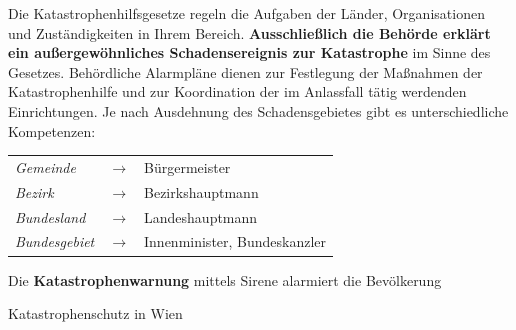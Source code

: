 \documentclass{article}
\newcommand\gEs[1]{\textbf{\textcolor[rgb]{0.0,0.0,0.5019608}{#1}}}
\newcommand\gEs[1]{\textbf{\textcolor[rgb]{0.0,0.0,0.5019608}{#1}}}
\newcommand\gE[1]{\textit{#1}}
\newcommand\gNw[1]{#1}
\begin{document}
{\mdseries
Die Katastrophenhilfsgesetze \gNw{r}egeln die Aufgaben der
L\"ander, Organisationen und Zust\"andigkeiten in Ihrem Bereich.
\gEs{Ausschlie{\ss}lich die Beh\"orde erkl\"art ein
au{\ss}ergew\"ohnliches Schadensereignis zur Katastrophe} im Sinne des
Gesetzes. Beh\"ordliche Alarmpl\"ane dienen zur Festlegung der
Ma{\ss}nahmen der Katastrophenhilfe und zur Koordination der im
Anlassfall t\"atig werdenden Einrichtungen. Je nach Ausdehnung des
Schadensgebietes gibt es unterschiedliche Kompetenzen:}

\begin{center}
\begin{tabular}{|m{2.375cm}m{0.45600003cm}m{6.1590004cm}|}
\hline
{\mdseries \gE{Gemeinde }}

 &
\centering ${\rightarrow}$\par

 &
{\mdseries B\"urgermeister}

\\
{\mdseries \gE{Bezirk }}

 &
\centering ${\rightarrow}$\par

 &
{\mdseries Bezirkshauptmann}

\\
{\mdseries \gE{Bundesland }}

 &
\centering ${\rightarrow}$\par

 &
{\mdseries Landeshauptmann}

\\
{\mdseries \gE{Bundesgebiet}}

 &
\centering ${\rightarrow}$\par

 &
{\mdseries Innenminister, Bundeskanzler}

\\\hline
\end{tabular}
\end{center}
{\mdseries\color{black}
Die \gEs{Katastrophenwarnung} mittels Sirene
alarmiert die Bev\"olkerung}

{\mdseries\color[rgb]{0.0,0.0,0.5019608}
Katastrophenschutz in Wien}
\end{document}
